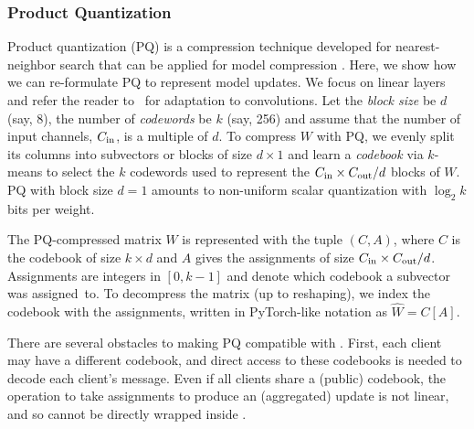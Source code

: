 \subsubsection{Product Quantization}
\label{subsec:pq}


Product quantization (PQ) is a compression technique developed for nearest-neighbor search \citep{jegou2011product} that can be applied for model compression \citep{stock2019bit}. 
Here, we show how we can re-formulate PQ to represent model updates. 
We focus on linear layers and refer the reader to~\cite{stock2019bit} for adaptation to convolutions.
Let the \emph{block size} be $d$ (say, 8), the number of \emph{codewords} be $k$ (say, 256) and assume that the number of input channels, $C_{\text{in}}$, is a multiple of $d$. 
To compress $W$ with PQ, we evenly split its columns into subvectors or blocks of size $d \times 1$ and learn a \emph{codebook} via $k$-means to select the $k$ codewords used to represent the $C_{\text{in}}\times C_{\text{out}}/d$ blocks of $W$. PQ with block size $d=1$ amounts to non-uniform scalar quantization with $\log_2 k$ bits per weight.

The PQ-compressed matrix $W$ is represented with the tuple $(C, A)$, where $C$ is the codebook of size $k \times d$ and $A$ gives the assignments of size $C_{\text{in}} \times C_{\text{out}} / d$.
Assignments are integers in $[0, k-1]$ and denote which codebook a subvector was assigned~to. 
To decompress the matrix (up to reshaping), we index the codebook with the assignments, written in PyTorch-like notation as
$
    \widehat {W} = C[A].
$

There are several obstacles to making PQ compatible with \SecAgg.  
First, each client may have a different codebook, and direct access to these codebooks is needed to decode each client's message.  
Even if all clients share a (public) codebook, the operation to take assignments to produce an (aggregated) update is not linear, and so cannot be directly wrapped inside \SecAgg. 

